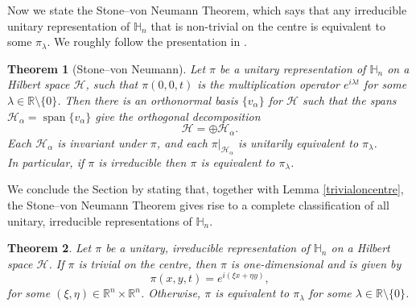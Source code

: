 \documentclass[12pt,oneside,a4paper]{book}
\numberwithin{equation}{section}     %
\theoremstyle{plain}
\newtheorem{theorem}{Theorem}[section]
\theoremstyle{definition}
\DeclareMathOperator{\SPAN}{span}
\newcommand{\R}{{\mathbb R}}
\newcommand{\Rn}{{\R}^n}
\begin{document}
Now we state the Stone--von Neumann Theorem, which says that any irreducible unitary representation of $\mathbb{H}_n$ that is non-trivial on the centre is equivalent to some $\pi_\lambda$. We roughly follow the presentation in \cite[Section 1.5]{Fol}.
\begin{theorem}[Stone--von Neumann]
	Let $\pi$ be a unitary representation of $\mathbb{H}_n$ on a Hilbert space $\mathcal H$, such that $\pi(0,0,t)$ is the multiplication operator $e^{i\lambda t}$ for some $\lambda\in\R\setminus\{0\}$. Then there is an orthonormal basis $\{v_\alpha\}$ for $\mathcal{H}$ such that the spans $\mathcal{H}_\alpha=\SPAN\{v_\alpha\}$ give the orthogonal decomposition
	\[
	\mathcal{H}=\oplus \mathcal H_{\alpha}.
	\]
	Each $\mathcal{H}_\alpha$ is invariant under $\pi$, and each $\pi|_{\mathcal H_\alpha}$ is unitarily equivalent to $\pi_\lambda$.\\
	In particular, if $\pi$ is irreducible then $\pi$ is equivalent to $\pi_\lambda$.
\end{theorem}
We conclude the Section by stating that, together with Lemma \ref{trivialoncentre}, the Stone--von Neumann Theorem gives rise to a complete classification of all unitary, irreducible representations of $\mathbb{H}_n$.
\newpage
\begin{theorem}
	Let $\pi$ be a unitary, irreducible representation of $\mathbb{H}_n$ on a Hilbert space $\mathcal H$. If $\pi$ is trivial on the centre, then $\pi$ is one-dimensional and is given by
	\[
	\pi(x,y,t)=e^{i(\xi x +\eta y)},
	\]
	for some $(\xi,\eta)\in\Rn\times\Rn$. Otherwise, $\pi$ is equivalent to $\pi_\lambda$ for some $\lambda\in\R\setminus\{0\}$.
\end{theorem}

\end{document}
